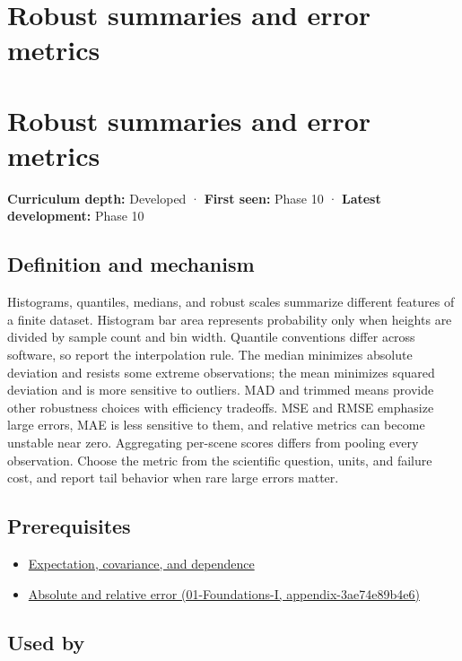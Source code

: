 \hypertarget{appendix-bcc44e9d3d02}{}
\section*{Robust summaries and error metrics}
\section{Robust summaries and error metrics}\label{robust-summaries-and-error-metrics}

\textbf{Curriculum depth:} Developed · \textbf{First seen:} Phase 10 · \textbf{Latest development:} Phase 10

\subsection{Definition and mechanism}\label{definition-and-mechanism}

Histograms, quantiles, medians, and robust scales summarize different features of a finite dataset. Histogram bar area represents probability only when heights are divided by sample count and bin width. Quantile conventions differ across software, so report the interpolation rule. The median minimizes absolute deviation and resists some extreme observations; the mean minimizes squared deviation and is more sensitive to outliers. MAD and trimmed means provide other robustness choices with efficiency tradeoffs. MSE and RMSE emphasize large errors, MAE is less sensitive to them, and relative metrics can become unstable near zero. Aggregating per-scene scores differs from pooling every observation. Choose the metric from the scientific question, units, and failure cost, and report tail behavior when rare large errors matter.

\subsection{Prerequisites}\label{prerequisites}

\begin{itemize}
\tightlist
\item
  \hyperref[appendix-54c383df9992]{Expectation, covariance, and dependence}
\item
  \href{}{Absolute and relative error (01-Foundations-I, appendix-3ae74e89b4e6)}
\end{itemize}

\subsection{Used by}\label{used-by}

